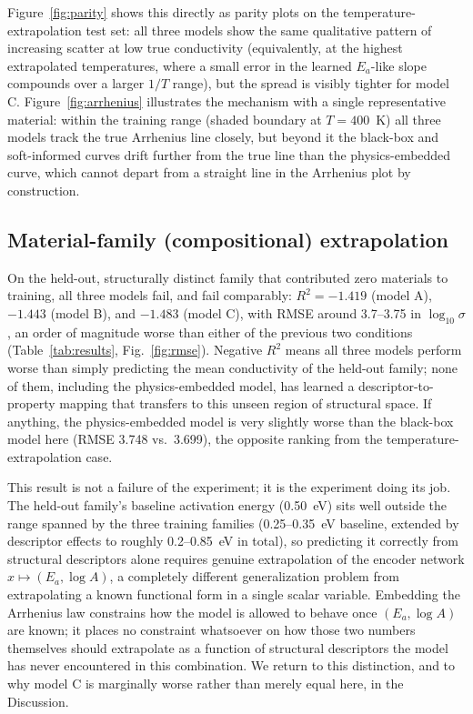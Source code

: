 \documentclass[11pt]{article}
\begin{document}
Figure~\ref{fig:parity} shows this directly as parity plots on the temperature-extrapolation test set: all three models show the same qualitative pattern of increasing scatter at low true conductivity (equivalently, at the highest extrapolated temperatures, where a small error in the learned $E_a$-like slope compounds over a larger $1/T$ range), but the spread is visibly tighter for model C. Figure~\ref{fig:arrhenius} illustrates the mechanism with a single representative material: within the training range (shaded boundary at $T=400$~K) all three models track the true Arrhenius line closely, but beyond it the black-box and soft-informed curves drift further from the true line than the physics-embedded curve, which cannot depart from a straight line in the Arrhenius plot by construction.

\subsection{Material-family (compositional) extrapolation}

On the held-out, structurally distinct family that contributed zero materials to training, all three models fail, and fail comparably: $R^2 = -1.419$ (model A), $-1.443$ (model B), and $-1.483$ (model C), with RMSE around 3.7–3.75 in $\log_{10}\sigma$, an order of magnitude worse than either of the previous two conditions (Table~\ref{tab:results}, Fig.~\ref{fig:rmse}). Negative $R^2$ means all three models perform worse than simply predicting the mean conductivity of the held-out family; none of them, including the physics-embedded model, has learned a descriptor-to-property mapping that transfers to this unseen region of structural space. If anything, the physics-embedded model is very slightly worse than the black-box model here (RMSE 3.748 vs.\ 3.699), the opposite ranking from the temperature-extrapolation case.

This result is not a failure of the experiment; it is the experiment doing its job. The held-out family's baseline activation energy (0.50~eV) sits well outside the range spanned by the three training families (0.25–0.35~eV baseline, extended by descriptor effects to roughly 0.2–0.85~eV in total), so predicting it correctly from structural descriptors alone requires genuine extrapolation of the encoder network $x \mapsto (E_a, \log A)$, a completely different generalization problem from extrapolating a known functional form in a single scalar variable. Embedding the Arrhenius law constrains how the model is allowed to behave once $(E_a, \log A)$ are known; it places no constraint whatsoever on how those two numbers themselves should extrapolate as a function of structural descriptors the model has never encountered in this combination. We return to this distinction, and to why model C is marginally worse rather than merely equal here, in the Discussion.
\end{document}
